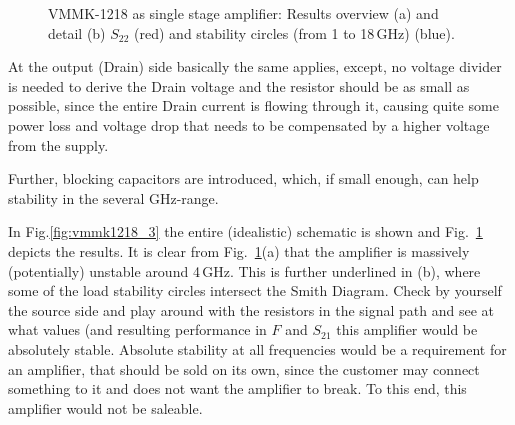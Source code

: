 \begin{figure}
  \centering
  \caption{VMMK-1218 as single stage amplifier: Results overview (a)
    and detail (b) $S_{22}$ (red) and stability circles (from 1 to
    18\,GHz) (blue).}
  \label{fig:vmmk1218_3_result}
\end{figure}


At the output (Drain) side basically the same applies, except, no
voltage divider is needed to derive the Drain voltage and the resistor
should be as small as possible, since the entire Drain current is
flowing through it, causing quite some power loss and voltage drop
that needs to be compensated by a higher voltage from the supply.

Further, blocking capacitors are introduced, which, if small enough,
can help stability in the several GHz-range.

In Fig.\ref{fig:vmmk1218_3} the entire (idealistic) schematic is shown
and Fig.~\ref{fig:vmmk1218_3_result} depicts the results. It is clear
from Fig.~\ref{fig:vmmk1218_3_result}(a)
that the amplifier is massively (potentially) unstable around
4\,GHz. This is further underlined in (b), where some of the load
stability circles intersect the Smith Diagram. Check by yourself the
source side and play around with the resistors in the signal path and
see at what values (and resulting performance in $F$ and $S_{21}$ this
amplifier would be absolutely stable. Absolute stability at all
frequencies would be a requirement for an amplifier, that should be
sold on its own, since the customer may connect something to it and
does not want the amplifier to break. To this end, this amplifier
would not be saleable. 

